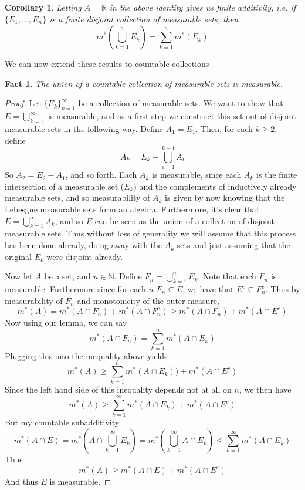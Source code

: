 \documentclass{article}
\theoremstyle{definition}
\theoremstyle{plain}
\theoremstyle{theorem}
\newtheorem{fact}{Fact}[section]
\newtheorem{corollary}{Corollary}[section]
\begin{document}
\begin{corollary}
	Letting $A = \mathbb{R}$ in the above identity gives us finite additivity, i.e. if $\{E_1,...,E_n\}$ is a finite disjoint collection of measurable sets, then
	\[ m^* \left( \bigcup_{k=1}^nE_k \right) = \sum_{k=1}^n m^*(E_k) \]
\end{corollary}
We can now extend these results to countable collections
\begin{fact}
	The union of a countable collection of measurable sets is measurable.
\end{fact}
\begin{proof}
	Let $\{E_k\}_{k=1}^{\infty}$ be a collection of measurable sets. We want to show that $E=\bigcup_{k=1}^{\infty}$ is measurable, and as a first step we construct this set out of disjoint measurable sets in the following way. Define $A_1 = E_1$. Then, for each $k \geq 2$, define
	\[ A_k = E_k - \bigcup_{i=1}^{k-1}A_i \]
So $A_2 = E_2 - A_1$, and so forth. Each $A_k$ is measurable, since each $A_k$ is the finite intersection of a measurable set ($E_k$) and the complements of inductively already measurable sets, and so measurability of $A_k$ is given by now knowing that the Lebesgue measurable sets form an algebra. Furthermore, it's clear that $E = \bigcup_{k=1}^{\infty}A_k$, and so $E$ can be seen as the union of a collection of disjoint measurable sets. Thus without loss of generality we will assume that this process has been done already, doing away with the $A_k$ sets and just assuming that the original $E_k$ were disjoint already. \par
Now let $A$ be a set, and $n \in \mathbb{N}$. Define $F_n = \bigcup_{k=1}^n E_k$. Note that each $F_n$ is measurable. Furthermore since for each $n$ $F_n \subseteq E$, we have that $E^c \subseteq F_n^c$. Thus by measurability of $F_n$ and monotonicity of the outer measure,
\[ m^*(A) = m^*(A \cap F_n) + m^*(A \cap F_n^c) \geq m^*(A \cap F_n) + m^*(A \cap E^c) \]
Now using our lemma, we can say
\[ m^*(A \cap F_n) = \sum_{k=1}^n m^*(A \cap E_k) \]
Plugging this into the inequality above yields
\[ m^*(A) \geq \sum_{k=1}^n m^*(A \cap E_k)) + m^*(A \cap E^c) \]
Since the left hand side of this inequality depends not at all on $n$, we then have
\[ m^*(A) \geq \sum_{k=1}^{\infty} m^*(A \cap E_k) + m^*(A \cap E^c) \]
But my countable subadditivity
\[m^*(A \cap E) =  m^*\left(A \cap \bigcup_{k=1}^{\infty}E_k \right) = m^*\left(\bigcup_{k=1}^{\infty} A \cap E_k \right) \leq \sum_{k=1}^{\infty} m^*(A \cap E_k) \]
Thus 
\[ m^*(A) \geq m^*(A \cap E) + m^*(A \cap E^c) \]
And thus $E$ is measurable.
\end{proof}
\end{document}
